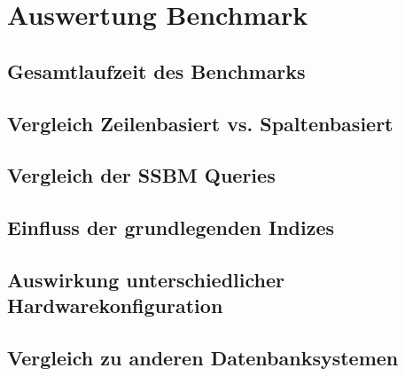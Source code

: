 \chapter{Auswertung Benchmark}

\section{Gesamtlaufzeit des Benchmarks}\label{auswertung:generell}


\section{Vergleich Zeilenbasiert vs. Spaltenbasiert}\label{auswertung:row_vs_col}


\section{Vergleich der SSBM Queries}\label{auswertung:queries}


\section{Einfluss der grundlegenden Indizes}\label{auswertung:basic_indizes}


\section{Auswirkung unterschiedlicher Hardwarekonfiguration}\label{auswertung:hardware}


\section{Vergleich zu anderen Datenbanksystemen}\label{auswertung:vergleich}


